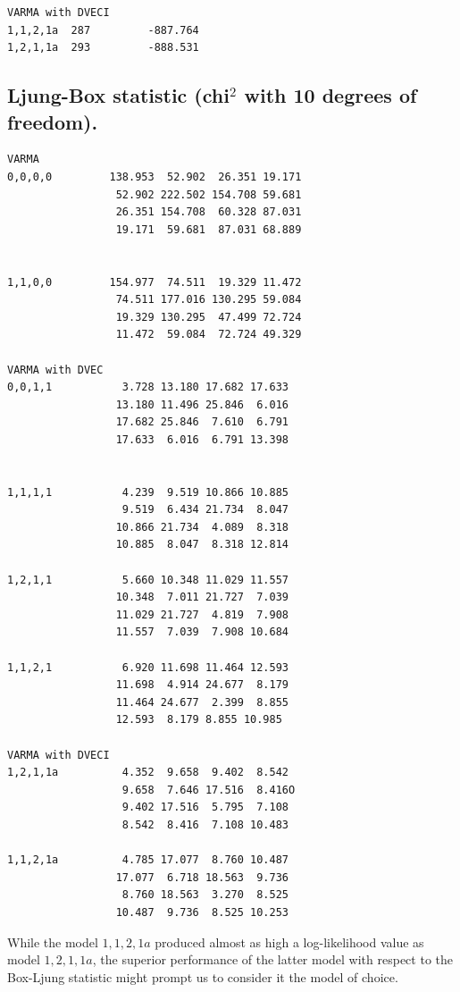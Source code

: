 {\begin{lstlisting}
VARMA with DVECI
1,1,2,1a  287         -887.764 
1,2,1,1a  293         -888.531 
\end{lstlisting}

\bigskip
\subsection{Ljung-Box statistic (chi${}^2$ with 10 degrees of freedom).}
\begin{lstlisting}
VARMA
0,0,0,0         138.953  52.902  26.351 19.171
                 52.902 222.502 154.708 59.681
                 26.351 154.708  60.328 87.031
                 19.171  59.681  87.031 68.889


1,1,0,0         154.977  74.511  19.329 11.472
                 74.511 177.016 130.295 59.084
                 19.329 130.295  47.499 72.724
                 11.472  59.084  72.724 49.329

VARMA with DVEC
0,0,1,1           3.728 13.180 17.682 17.633
                 13.180 11.496 25.846  6.016
                 17.682 25.846  7.610  6.791
                 17.633  6.016  6.791 13.398


1,1,1,1           4.239  9.519 10.866 10.885
                  9.519  6.434 21.734  8.047
                 10.866 21.734  4.089  8.318
                 10.885  8.047  8.318 12.814

1,2,1,1           5.660 10.348 11.029 11.557
                 10.348  7.011 21.727  7.039
                 11.029 21.727  4.819  7.908
                 11.557  7.039  7.908 10.684

1,1,2,1           6.920 11.698 11.464 12.593
                 11.698  4.914 24.677  8.179
                 11.464 24.677  2.399  8.855
                 12.593  8.179 8.855 10.985

VARMA with DVECI
1,2,1,1a          4.352  9.658  9.402  8.542
                  9.658  7.646 17.516  8.416O
                  9.402 17.516  5.795  7.108
                  8.542  8.416  7.108 10.483

1,1,2,1a          4.785 17.077  8.760 10.487
                 17.077  6.718 18.563  9.736
                  8.760 18.563  3.270  8.525
                 10.487  9.736  8.525 10.253
\end{lstlisting}

While the model $1,1,2,1a$ produced almost as high a
log-likelihood value as model $1,2,1,1a$, the superior
performance of the latter model with respect to the 
Box-Ljung statistic might prompt us to consider it the model of choice.

}
